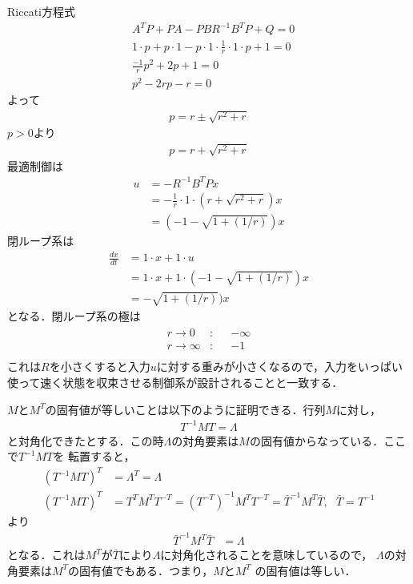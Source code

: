 \documentclass[a4paper,11pt]{jreport}
\begin{document}
Riccati方程式
\begin{align*}
	& A^T P + P A - P B R^{-1} B^T P + Q = 0 \\
	& 1 \cdot p + p \cdot 1 - p \cdot 1 \cdot \frac{1}{r} \cdot 1 \cdot p + 1 = 0 \\
	& \frac{-1}{r} p^2 + 2p + 1 = 0 \\
	& p^2 -2rp - r = 0
\end{align*}
よって
\begin{align*}
	p = r \pm \sqrt{r^2 + r}
\end{align*}
$p>0$より
\begin{align*}
	p = r + \sqrt{r^2+r}
\end{align*}
最適制御は
\begin{align*}
	u &= -R^{-1}B^T P x \\
	&= -\frac{1}{r} \cdot 1 \cdot (r + \sqrt{r^2+r}) x \\
	&= (-1 - \sqrt{1 + (1/r)}) x
\end{align*}
閉ループ系は
\begin{align*}
	\frac{dx}{dt} & = 1 \cdot x + 1 \cdot u \\
	&= 1 \cdot x + 1 \cdot (-1 - \sqrt{1 + (1/r)}) x \\
	&= - \sqrt{1 + (1/r)}) x
\end{align*}
となる．閉ループ系の極は
\begin{align*}
	\begin{array}{lccr}
		r \rightarrow 0 & : && - \infty \\
		r \rightarrow \infty & : && -1 \\
	\end{array}
\end{align*}
これは$R$を小さくすると入力$u$に対する重みが小さくなるので，入力をいっぱい使って速く状態を収束させる制御系が設計されることと一致する．

\newpage

$M$と$M^T$の固有値が等しいことは以下のように証明できる．行列$M$に対し，
\begin{align}
   T^{-1}MT = \Lambda
\end{align}
と対角化できたとする．この時$\Lambda$の対角要素は$M$の固有値からなっている．ここで$T^{-1}MT$を
転置すると，
\begin{align}
   (T^{-1}MT)^T &=  \Lambda^T = \Lambda
\\
   (T^{-1}MT)^T &= T^T M^T T^{-T} = (T^{-T})^{-1} M^T T^{-T} = \bar{T}^{-1} M^T \bar{T}
   , \ \ \ \bar{T} = T^{-1}
\end{align}
より
\begin{align}
   \bar{T}^{-1} M^T \bar{T} &=  \Lambda
\end{align}
となる．これは$M^{T}$が$\bar{T}$により$\Lambda$に対角化されることを意味しているので，
$\Lambda$の対角要素は$M^{T}$の固有値でもある．つまり，$M$と$M^{T}$
の固有値は等しい．
\end{document}
